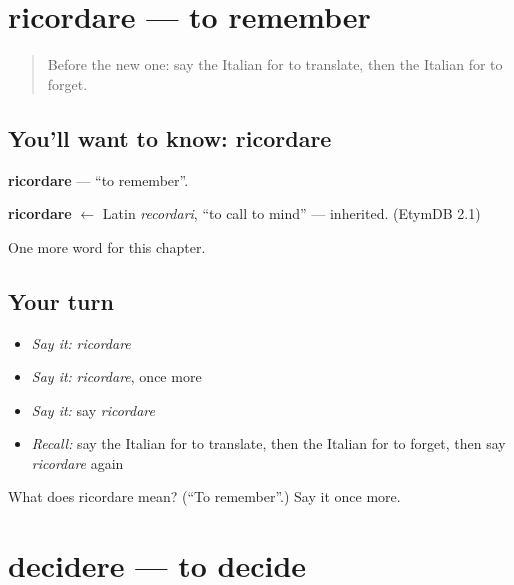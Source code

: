 \section[ricordare]{ricordare — to remember}

\label{lesson:IT-C175-ricordare}



\begin{quote}
Before the new one: say the Italian for to translate, then the Italian for to forget.
\end{quote}

\subsection*{You'll want to know: ricordare}
\textbf{ricordare} — \textquotedblleft{}to remember\textquotedblright{}.

\begin{cousinweb}
\textbf{ricordare} $\leftarrow$ Latin \emph{recordari}, \textquotedblleft{}to call to mind\textquotedblright{} — inherited. (EtymDB 2.1)
\end{cousinweb}

\begin{grammarlens}[title={What you've built}]
One more word for this chapter.
\end{grammarlens}

\subsection*{Your turn}
\begin{itemize}
\raggedright
  \item \emph{Say it:} \emph{ricordare}
  \item \emph{Say it:} \emph{ricordare}, once more
  \item \emph{Say it:} say \emph{ricordare}
  \item \emph{Recall:} say the Italian for to translate, then the Italian for to forget, then say \emph{ricordare} again
\end{itemize}

\begin{tcolorbox}[breakable,colback=teal!4,colframe=teal!35!black,title={Before you move on}]
What does ricordare mean? (\textquotedblleft{}To remember\textquotedblright{}.) Say it once more.
\end{tcolorbox}
\section[decidere]{decidere — to decide}

